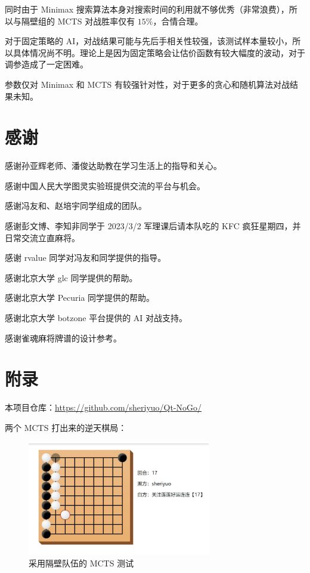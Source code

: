 \documentclass{noithesis}
\begin{document}
	同时由于 Minimax 搜索算法本身对搜索时间的利用就不够优秀（非常浪费），所以与隔壁组的 MCTS 对战胜率仅有 $15\%$，合情合理。
	
	对于固定策略的 AI，对战结果可能与先后手相关性较强，该测试样本量较小，所以具体情况尚不明。理论上是因为固定策略会让估价函数有较大幅度的波动，对于调参造成了一定困难。
	
	参数仅对 Minimax 和 MCTS 有较强针对性，对于更多的贪心和随机算法对战结果未知。
		
	\section{感谢}
	
	感谢孙亚辉老师、潘俊达助教在学习生活上的指导和关心。
	
	感谢中国人民大学图灵实验班提供交流的平台与机会。
	
	感谢冯友和、赵培宇同学组成的团队。
	
	感谢彭文博、李知非同学于 2023/3/2 军理课后请本队吃的 KFC 疯狂星期四，并日常交流立直麻将。
	
	感谢 rvalue 同学对冯友和同学提供的指导。
	
	感谢北京大学 glc 同学提供的帮助。
	
	感谢北京大学 Pecuria 同学提供的帮助。
	
	感谢北京大学 botzone 平台提供的 AI 对战支持。
	
	感谢雀魂麻将牌谱的设计参考。
	
	\section{附录}
	
	本项目仓库：\href{https://github.com/sheriyuo/Qt-NoGo/}{https://github.com/sheriyuo/Qt-NoGo/}
	
	两个 MCTS 打出来的逆天棋局：
	
	\begin{figure}[!htb]
	
		\centering
		\includegraphics[width=8cm]{img/ps1.jpg}
			
		\caption{采用隔壁队伍的 MCTS 测试}
	\end{figure}
\end{document}
